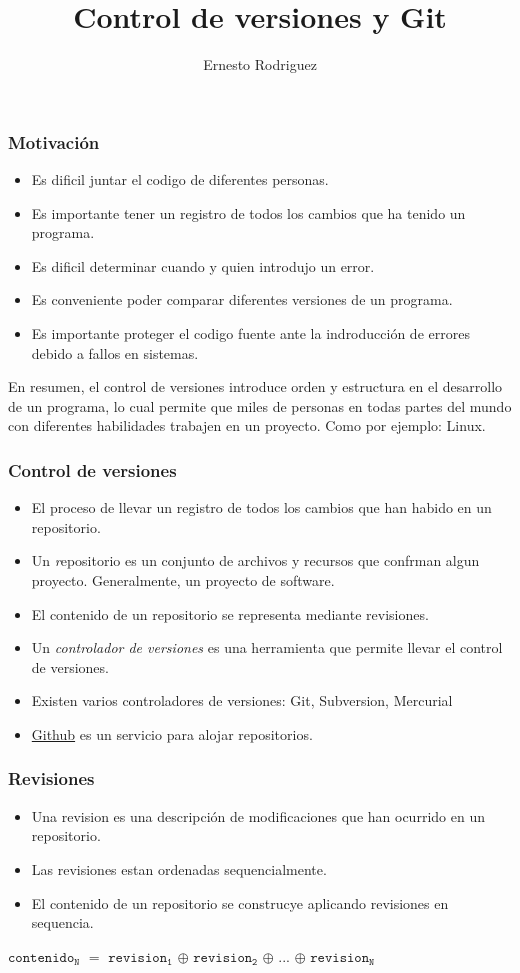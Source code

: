 \documentclass{beamer}
\title[Git]{Control de versiones y Git}
\author{Ernesto Rodriguez}
\institute{
    Universidad del Itsmo \\
    \medskip \textit{erodriguez@unis.edu.gt}
}
\date[\today]{}
\begin{document}
\begin{frame}
\titlepage
\end{frame}

\begin{frame}
    \frametitle{Motivaci\'on}
    \begin{itemize}
        \item{Es dificil juntar el codigo de diferentes personas.}
        \item{Es importante tener un registro de todos los cambios que ha tenido un programa.}
        \item{Es dificil determinar cuando y quien introdujo un error.}
        \item{Es conveniente poder comparar diferentes versiones de un programa.}
        \item{Es importante proteger el codigo fuente ante la indroducci\'on de errores debido a fallos en sistemas.}
    \end{itemize}
En resumen, el control de versiones introduce orden y estructura en el
desarrollo de un programa, lo cual permite que miles de personas en
todas partes del mundo con diferentes habilidades trabajen en un proyecto.
Como por ejemplo: Linux.
\end{frame}

\begin{frame}
\frametitle{Control de versiones}
\begin{itemize}
    \item{El proceso de llevar un registro de todos los cambios que 
    han habido en un repositorio.}
    \item{Un {\emph repositorio} es un conjunto de archivos y recursos
    que confrman algun proyecto. Generalmente, un proyecto de software.}
    \item{El contenido de un repositorio se representa mediante revisiones.}
    \item{Un \emph{controlador de versiones} es una herramienta que permite
    llevar el control de versiones.}
    \item{Existen varios controladores de versiones: Git, Subversion, Mercurial}
    \item{\href{https://github.com/}{Github} es un servicio para alojar repositorios.}
\end{itemize}
\end{frame}

\begin{frame}
\frametitle{Revisiones}
\begin{itemize}
    \item Una revision es una descripci\'on de modificaciones que han ocurrido en un repositorio.
    \item Las revisiones estan ordenadas sequencialmente.
    \item El contenido de un repositorio se construcye aplicando revisiones en sequencia.
\end{itemize}
\begin{center}
$\mathtt{contenido_N}$ $=$ $\mathtt{revision_1}$ $\oplus$ $\mathtt{revision_2}$ $\oplus$ ... $\oplus$ $\mathtt{revision_N}$
\end{center}
\end{frame}
\end{document}
